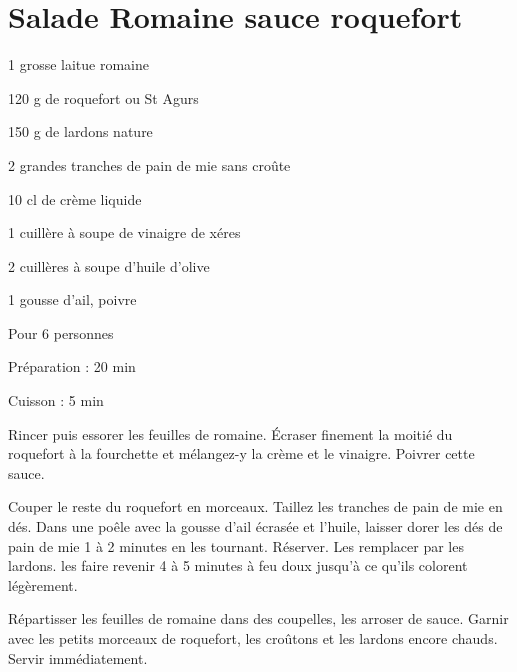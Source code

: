 \section{Salade Romaine sauce roquefort}

\begin{ingredients}
\item 1 grosse laitue romaine
\item 120 g de roquefort ou St Agurs
\item 150 g de lardons nature
\item 2 grandes tranches de pain de mie sans croûte
\item 10 cl de crème liquide
\item 1 cuillère à soupe de vinaigre de xéres
\item 2 cuillères à soupe d'huile d'olive
\item 1 gousse d'ail, poivre
\end{ingredients}
\begin{infos}
\item Pour 6 personnes		%
\item Préparation : 20 min		%
\item Cuisson : 5 min			%
\end{infos}
\begin{etapes}
\item Rincer puis essorer les feuilles de romaine. Écraser finement la moitié du roquefort à la fourchette et mélangez-y la crème et le vinaigre. Poivrer cette sauce.
\item Couper le reste du roquefort en morceaux. Taillez les tranches de pain de mie en dés. Dans une poêle avec la gousse d'ail écrasée et l'huile, laisser dorer les dés de pain de mie 1 à 2 minutes en les tournant. Réserver. Les remplacer par les lardons. les faire revenir 4 à 5 minutes à feu doux jusqu'à ce qu'ils colorent légèrement.
\item Répartisser les feuilles de romaine dans des coupelles, les arroser de sauce. Garnir avec les petits morceaux de roquefort, les croûtons et les lardons encore chauds. Servir immédiatement.
\end{etapes}
\begin{conseils}
\end{conseils}
